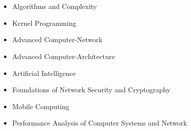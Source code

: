  \hfill \\[-0.4cm]
\hspace*{0.45cm} 
 \hfill \\[-0.8cm]

\begin{multicols}{3}
\begin{itemize}
\item Algorithms and Complexity  \\[-0.6cm]     
\item Kernel Programming \\[-0.6cm]
\item Advanced Computer-Network \\[-0.6cm]
\end{itemize}

\columnbreak
\begin{itemize}
\item Advanced Computer-Architecture\\[-0.6cm]
\item Artificial Intelligence \\[-0.6cm]
\item Foundations of Network Security and Cryptography\\[-0.6cm]
\end{itemize}

\columnbreak
\begin{itemize}
\item Mobile Computing\\[-0.6cm]
\item Performance Analysis of Computer Systems and Network \\[-0.6cm]
\end{itemize}

\end{multicols}




